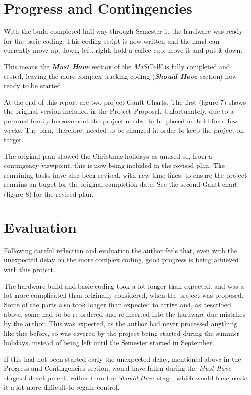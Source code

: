 \documentclass[progress]{cmpreport}
\begin{document}
\section{Progress and Contingencies}
With the build completed half way through Semester 1, the hardware was ready for the basic coding. This coding script is now written and the hand can currently move up, down, left, right, hold a coffee cup, move it and put it down. 

This means the \textbf{\textit{Must Have}} section of the \textit{MoSCoW} is fully completed and tested, leaving the more complex tracking coding  (\textbf{\textit{Should Have}} section) now ready to be started.

At the end of this report are two project Gantt Charts. The first (figure 7) shows the original version included in the Project Proposal. Unfortunately, due to a personal family bereavement the project needed to be placed on hold for a few weeks. The plan, therefore, needed to be changed in order to keep the project on target. 

The original plan showed the Christmas holidays as unused so, from a contingency viewpoint, this is now being included in the revised plan. The remaining tasks have also been revised, with new time-lines, to ensure the project remains on target for the original completion date. See the second Gantt chart (figure 8) for the revised plan.

\section{Evaluation}
Following careful reflection and evaluation the author feels that, even with the unexpected delay on the more complex coding, good progress is being achieved with this project. 

The hardware build and basic coding took a lot longer than expected, and was a lot more complicated than originally considered, when the project was proposed. Some of the parts also took longer than expected to arrive and, as described above, some had to be re-ordered and re-inserted into the hardware due mistakes by the author. This was expected, as the author had never processed anything like this before, so was covered by the project being started during the summer holidays, instead of being left until the Semester started in September.

If this had not been started early the unexpected delay, mentioned above in the Progress and Contingencies section, would have fallen during the \textit{Must Have} stage of development, rather than the \textit{Should Have} stage, which would have made it a lot more difficult to regain control. 
\end{document}
